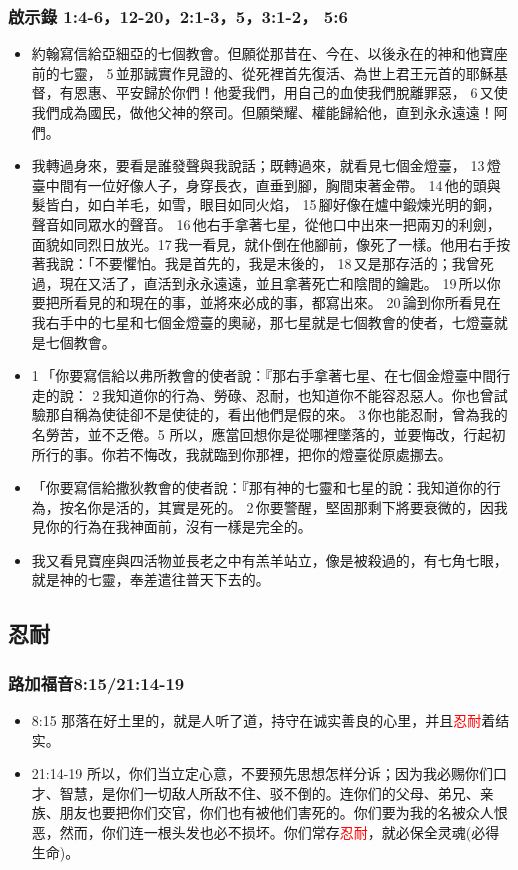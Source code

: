 \subsubsection{啟示錄 1:4-6，12-20，2:1-3，5，3:1-2， 5:6}
\begin{itemize} 
\itemsep-.25em
\item 約翰寫信給亞細亞的七個教會。但願從那昔在、今在、以後永在的神和他寶座前的七靈， 5 並那誠實作見證的、從死裡首先復活、為世上君王元首的耶穌基督，有恩惠、平安歸於你們！他愛我們，用自己的血使我們脫離罪惡， 6 又使我們成為國民，做他父神的祭司。但願榮耀、權能歸給他，直到永永遠遠！阿們。
\item 我轉過身來，要看是誰發聲與我說話；既轉過來，就看見七個金燈臺， 13 燈臺中間有一位好像人子，身穿長衣，直垂到腳，胸間束著金帶。 14 他的頭與髮皆白，如白羊毛，如雪，眼目如同火焰， 15 腳好像在爐中鍛煉光明的銅，聲音如同眾水的聲音。 16 他右手拿著七星，從他口中出來一把兩刃的利劍，面貌如同烈日放光。17 我一看見，就仆倒在他腳前，像死了一樣。他用右手按著我說：「不要懼怕。我是首先的，我是末後的， 18 又是那存活的；我曾死過，現在又活了，直活到永永遠遠，並且拿著死亡和陰間的鑰匙。 19 所以你要把所看見的和現在的事，並將來必成的事，都寫出來。 20 論到你所看見在我右手中的七星和七個金燈臺的奧祕，那七星就是七個教會的使者，七燈臺就是七個教會。
\item 1 「你要寫信給以弗所教會的使者說：『那右手拿著七星、在七個金燈臺中間行走的說： 2 我知道你的行為、勞碌、忍耐，也知道你不能容忍惡人。你也曾試驗那自稱為使徒卻不是使徒的，看出他們是假的來。 3 你也能忍耐，曾為我的名勞苦，並不乏倦。5 所以，應當回想你是從哪裡墜落的，並要悔改，行起初所行的事。你若不悔改，我就臨到你那裡，把你的燈臺從原處挪去。
\item 「你要寫信給撒狄教會的使者說：『那有神的七靈和七星的說：我知道你的行為，按名你是活的，其實是死的。 2 你要警醒，堅固那剩下將要衰微的，因我見你的行為在我神面前，沒有一樣是完全的。
\item 我又看見寶座與四活物並長老之中有羔羊站立，像是被殺過的，有七角七眼，就是神的七靈，奉差遣往普天下去的。
\end{itemize} 






\subsection{忍耐}
\subsubsection{路加福音8:15/21:14-19}
\begin{itemize}[noitemsep]
\item 8:15 那落在好土里的，就是人听了道，持守在诚实善良的心里，并且\textcolor{red}{忍耐}着结实。
\item 21:14-19 所以，你们当立定心意，不要预先思想怎样分诉；因为我必赐你们口才、智慧，是你们一切敌人所敌不住、驳不倒的。连你们的父母、弟兄、亲族、朋友也要把你们交官，你们也有被他们害死的。你们要为我的名被众人恨恶，然而，你们连一根头发也必不损坏。你们常存\textcolor{red}{忍耐}，就必保全灵魂(必得生命)。
\end{itemize}
